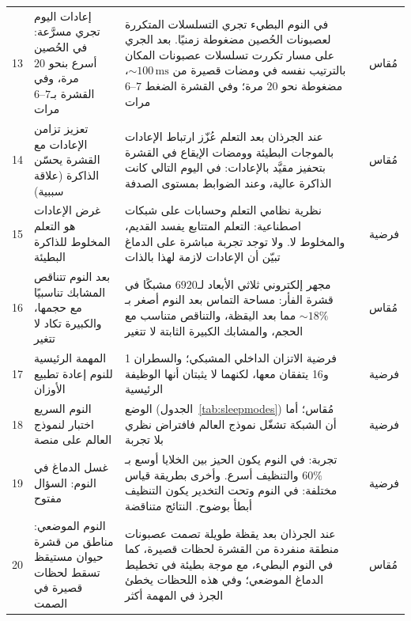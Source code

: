 {\begin{longtable}{>{\raggedright}p{0.5cm}>{\raggedright}p{4.0cm}>{\raggedright}p{5.6cm}>{\raggedright}p{2.3cm}>{\raggedright\arraybackslash}p{1.7cm}}
13 & إعادات اليوم تجري مسرَّعة: في الحُصين أسرع بنحو $20$ مرة، وفي القشرة بـ$6\text{--}7$ مرات & في النوم البطيء تجري التسلسلات المتكررة لعصبونات الحُصين مضغوطة زمنيًا. بعد الجري على مسار تكررت تسلسلات عصبونات المكان بالترتيب نفسه في ومضات قصيرة من $\sim100\,\text{ms}$، مضغوطة نحو $20$ مرة؛ وفي القشرة الضغط $6\text{--}7$ مرات & \cite{Nadasdy1999,LeeWilson2002,Euston2007} & مُقاس \\
14 & تعزيز تزامن الإعادات مع القشرة يحسّن الذاكرة (علاقة سببية) & عند الجرذان بعد التعلم عُزّز ارتباط الإعادات بالموجات البطيئة وومضات الإيقاع في القشرة بتحفيز مقيَّد بالإعادات: في اليوم التالي كانت الذاكرة عالية، وعند الضوابط بمستوى الصدفة & \cite{Maingret2016} & مُقاس \\
15 & غرض الإعادات هو التعلم المخلوط للذاكرة البطيئة & نظرية نظامي التعلم وحسابات على شبكات اصطناعية: التعلم المتتابع يفسد القديم، والمخلوط لا. ولا توجد تجربة مباشرة على الدماغ تبيّن أن الإعادات لازمة لهذا بالذات & \cite{McClelland1995} & فرضية \\
16 & بعد النوم تتناقص المشابك تناسبيًا مع حجمها، والكبيرة تكاد لا تتغير & مجهر إلكتروني ثلاثي الأبعاد لـ$6920$ مشبكًا في قشرة الفأر: مساحة التماس بعد النوم أصغر بـ$\sim18\%$ مما بعد اليقظة، والتناقص متناسب مع الحجم، والمشابك الكبيرة الثابتة لا تتغير & \cite{deVivo2017} & مُقاس \\
17 & المهمة الرئيسية للنوم إعادة تطبيع الأوزان & فرضية الاتزان الداخلي المشبكي؛ والسطران 1 و16 يتفقان معها، لكنهما لا يثبتان أنها الوظيفة الرئيسية & \cite{TononiCirelli2014} & فرضية \\
18 & النوم السريع اختبار لنموذج العالم على منصة & الوضع (الجدول~\ref{tab:sleepmodes}) مُقاس؛ أما أن الشبكة تشغّل نموذج العالم فافتراض نظري بلا تجربة & \cite{Hobson2009} & فرضية \\
19 & غسل الدماغ في النوم: السؤال مفتوح & تجربة: في النوم يكون الحيز بين الخلايا أوسع بـ$60\%$ والتنظيف أسرع. وأخرى بطريقة قياس مختلفة: في النوم وتحت التخدير يكون التنظيف أبطأ بوضوح. النتائج متناقضة & \cite{Xie2013,Miao2024} & فرضية \\
20 & النوم الموضعي: مناطق من قشرة حيوان مستيقظ تسقط لحظات قصيرة في الصمت & عند الجرذان بعد يقظة طويلة تصمت عصبونات منطقة منفردة من القشرة لحظات قصيرة، كما في النوم البطيء، مع موجة بطيئة في تخطيط الدماغ الموضعي؛ وفي هذه اللحظات يخطئ الجرذ في المهمة أكثر & \cite{Vyazovskiy2011} & مُقاس \\
\bottomrule
\end{longtable}}

